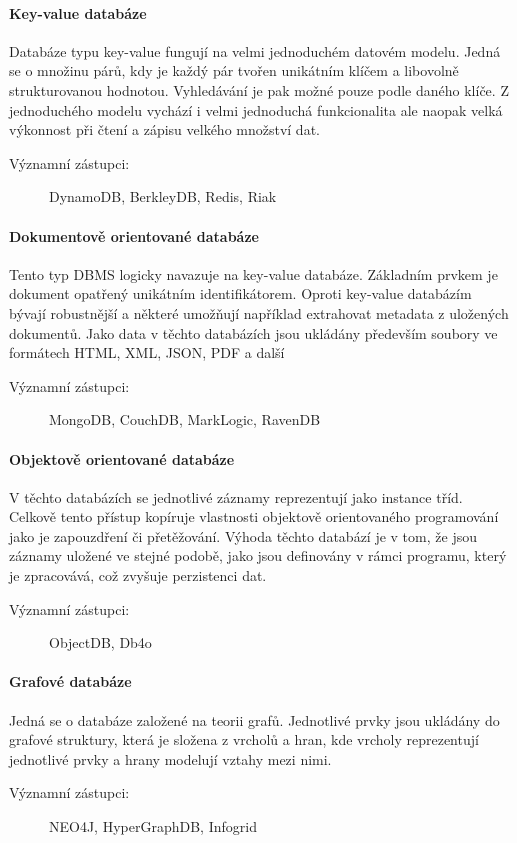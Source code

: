 \documentclass[thesis=M,czech]{FITthesis}[2012/06/26]
\begin{document}
\paragraph{Key-value databáze}
Databáze typu key-value fungují na velmi jednoduchém datovém modelu. Jedná se o množinu párů, kdy je každý pár tvořen unikátním klíčem a libovolně strukturovanou hodnotou. Vyhledávání je pak možné pouze podle daného klíče. Z jednoduchého modelu vychází i velmi jednoduchá funkcionalita ale naopak velká výkonnost při čtení a zápisu velkého množství dat.
\begin{description}
	\item[Významní zástupci: ] DynamoDB, BerkleyDB, Redis, Riak
\end{description}

\paragraph{Dokumentově orientované databáze}
Tento typ DBMS logicky navazuje na key-value databáze. Základním prvkem je dokument opatřený unikátním identifikátorem. Oproti key-value databázím bývají robustnější a některé umožňují například extrahovat metadata z uložených dokumentů. Jako data v těchto databázích jsou ukládány především soubory ve formátech HTML, XML, JSON, PDF a další
\begin{description}
	\item[Významní zástupci: ] MongoDB, CouchDB, MarkLogic, RavenDB
\end{description}

\paragraph{Objektově orientované databáze}
V těchto databázích se jednotlivé záznamy  reprezentují jako instance tříd.  Celkově tento přístup kopíruje vlastnosti objektově orientovaného programování jako je zapouzdření či přetěžování. Výhoda těchto databází je v tom, že jsou záznamy uložené ve stejné podobě, jako jsou definovány v rámci programu, který je zpracovává, což zvyšuje perzistenci dat.
\begin{description}
	\item[Významní zástupci: ] ObjectDB, Db4o
\end{description}

\paragraph{Grafové databáze}
Jedná se o databáze založené na teorii grafů. Jednotlivé prvky jsou ukládány do grafové struktury, která je složena z vrcholů a hran, kde vrcholy reprezentují  jednotlivé prvky a hrany modelují vztahy mezi nimi.
\begin{description}
	\item[Významní zástupci: ] NEO4J, HyperGraphDB, Infogrid
\end{description}
\end{document}
